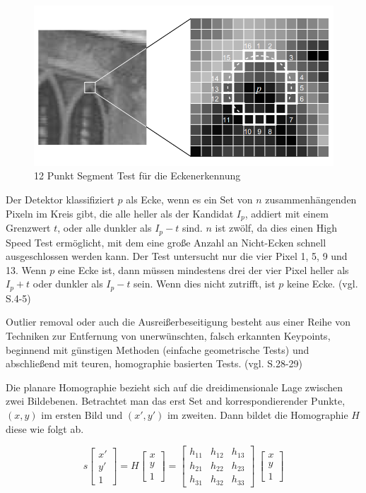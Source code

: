 \begin{figure}[H]
	\centering
	\includegraphics[scale=0.5]{fast.png}
	\caption{12 Punkt Segment Test für die Eckenerkennung \cite{fast}}
\end{figure}


Der Detektor klassifiziert $p$ als Ecke, wenn es ein Set von $n$ zusammenhängenden Pixeln im Kreis gibt, die alle heller als der Kandidat $I_p$, addiert mit einem Grenzwert $t$, oder alle dunkler als $I_p - t$ sind. $n$ ist zwölf, da dies einen High Speed Test ermöglicht, mit dem eine große Anzahl an Nicht-Ecken schnell ausgeschlossen werden kann. Der Test untersucht nur die vier Pixel 1, 5, 9 und 13. Wenn $p$ eine Ecke ist, dann müssen mindestens drei der vier Pixel heller als $I_p + t$ oder dunkler als $I_p - t$  sein. Wenn dies nicht zutrifft, ist $p$ keine Ecke. (vgl. \cite{fast} S.4-5)

\glqq Outlier removal\grqq{} oder auch die Ausreißerbeseitigung besteht aus einer Reihe von Techniken zur Entfernung von unerwünschten, falsch erkannten Keypoints, beginnend mit günstigen Methoden (einfache geometrische Tests) und abschließend mit teuren, homographie basierten Tests. (vgl. \cite{natural_feature} S.28-29) 


Die planare Homographie bezieht sich auf die dreidimensionale Lage zwischen zwei Bildebenen. Betrachtet man das erst Set and korrespondierender Punkte, $(x,y)$ im ersten Bild und $(x',y')$ im zweiten. Dann bildet die Homographie $H$ diese wie folgt ab.

\begin{equation}
  s  
  		\begin{bmatrix}
		x'\\
		y'\\
		1
     	\end{bmatrix}
     = H
     	\begin{bmatrix}
		x\\
		y\\
		1
     	\end{bmatrix}
      = 
     	\begin{bmatrix}
		h_{11} & h_{12} & h_{13}\\
		h_{21} & h_{22} & h_{23}\\
		h_{31} & h_{32} & h_{33}
     	\end{bmatrix}
      \
     	\begin{bmatrix}
		x\\
		y\\
		1
     	\end{bmatrix}
\end{equation}

